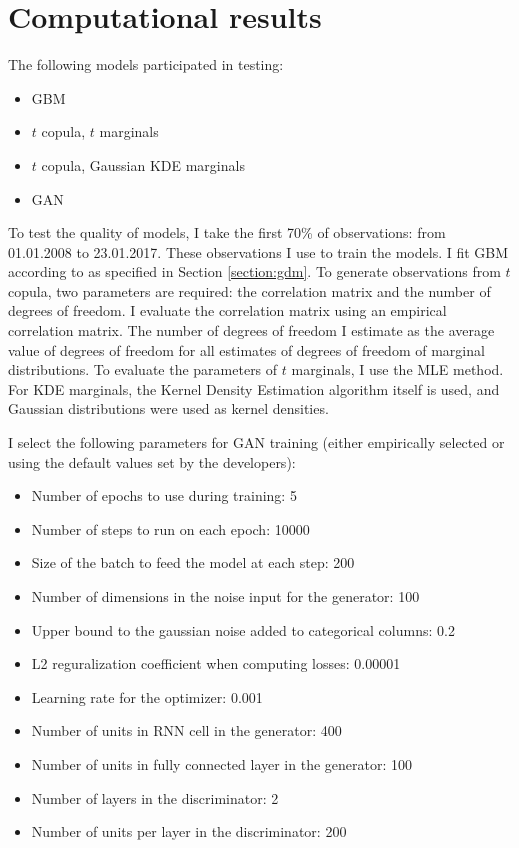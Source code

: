 \documentclass{article}
\begin{document}
\section{Computational results}
\label{section:results}
The following models participated in testing:
\begin{itemize}
    \item GBM
    \item $t$ copula, $t$ marginals
    \item $t$ copula, Gaussian KDE marginals
    \item GAN
\end{itemize}

To test the quality of models, I take the first 70\% of observations: from 01.01.2008 to 23.01.2017. These observations I use to train the models. I fit GBM according to as specified in Section \ref{section:gdm}. To generate observations from $t$ copula, two parameters are required: the correlation matrix and the number of degrees of freedom. I evaluate the correlation matrix using an empirical correlation matrix. The number of degrees of freedom I estimate as the average value of degrees of freedom for all estimates of degrees of freedom of marginal distributions. To evaluate the parameters of $t$ marginals, I use the MLE method. For KDE marginals, the Kernel Density Estimation algorithm itself is used, and Gaussian distributions were used as kernel densities.

I select the following parameters for GAN training (either empirically selected or using the default values set by the developers):
\begin{itemize}
    \item Number of epochs to use during training: 5
    \item Number of steps to run on each epoch: 10000
    \item Size of the batch to feed the model at each step: 200
    \item Number of dimensions in the noise input for the generator: 100
    \item Upper bound to the gaussian noise added to categorical columns: 0.2
    \item L2 reguralization coefficient when computing losses: 0.00001
    \item Learning rate for the optimizer: 0.001
    \item Number of units in RNN cell in the generator: 400
    \item Number of units in fully connected layer in the generator: 100
    \item Number of layers in the discriminator: 2
    \item Number of units per layer in the discriminator: 200
\end{itemize}
\end{document}
